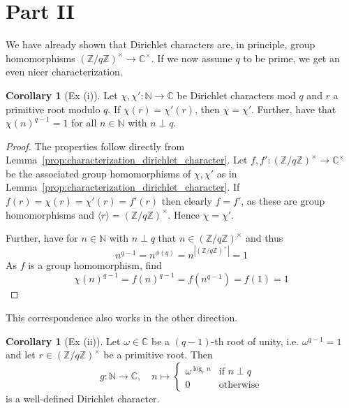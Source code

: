 \documentclass{scrartcl}
\newcommand{\N}{\mathbb{N}}
\newcommand{\Z}{\mathbb{Z}}
\newcommand{\C}{\mathbb{C}}
\newcommand{\units}{\times}
\theoremstyle{definition}
\newtheorem{corollary}[definition]{Corollary}
\begin{document}
\section{Part II}
We have already shown that Dirichlet characters are, in principle, group homomorphisms $(\Z/q\Z)^\units \to \C^\units$.
If we now assume $q$ to be prime, we get an even nicer characterization.
\begin{corollary}[Ex (i)]
    \label{prop:dirichlet_character_image_group}
    Let $\chi, \chi': \N \to \C$ be Dirichlet characters mod $q$ and $r$ a primitive root modulo $q$.
    If $\chi(r) = \chi'(r)$, then $\chi = \chi'$.
    Further, have that $\chi(n)^{q - 1} = 1$ for all $n \in \N$ with $n \perp q$.
\end{corollary}
\begin{proof}
    The properties follow directly from Lemma~\ref{prop:characterization_dirichlet_character}.
    Let $f, f': (\Z/q\Z)^\units \to \C^\units$ be the associated group homomorphisms of $\chi, \chi'$ as in Lemma~\ref{prop:characterization_dirichlet_character}.
    If $f(r) = \chi(r) = \chi'(r) = f'(r)$ then clearly $f = f'$, as these are group homomorphisms and $\langle r \rangle = (\Z/q\Z)^\units$.
    Hence $\chi = \chi'$.

    Further, have for $n \in \N$ with $n \perp q$ that $n \in (\Z/q\Z)^\units$ and thus
    \begin{equation*}
        n^{q - 1} = n^{\phi(q)} = n^{|(\Z/q\Z)^\units|} = 1 
    \end{equation*}
    As $f$ is a group homomorphism, find
    \begin{equation*}
        \chi(n)^{q - 1} = f(n)^{q - 1} = f(n^{q - 1}) = f(1) = 1
    \end{equation*}
\end{proof}
This correspondence also works in the other direction.
\begin{corollary}[Ex (ii)]
    \label{prop:dirichlet_character_primitive_root}
    Let $\omega \in \C$ be a $(q - 1)$-th root of unity, i.e. $\omega^{q - 1} = 1$ and let $r \in (\Z/q\Z)^\units$ be a primitive root.
    Then
    \begin{equation*}
        g: \N \to \C, \quad n \mapsto \begin{cases}
            \omega^{\log_r n} & \text{if $n \perp q$} \\
            0 & \text{otherwise}
        \end{cases}
    \end{equation*}
    is a well-defined Dirichlet character.
\end{corollary}
\end{document}
